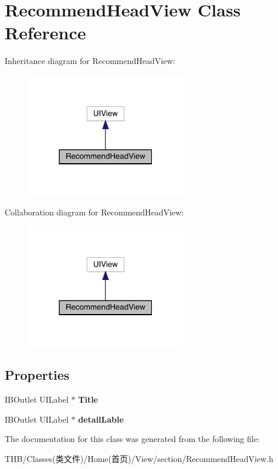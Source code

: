\hypertarget{interface_recommend_head_view}{}\section{Recommend\+Head\+View Class Reference}
\label{interface_recommend_head_view}


Inheritance diagram for Recommend\+Head\+View\+:\nopagebreak
\begin{figure}[H]
\begin{center}
\leavevmode
\includegraphics[width=198pt]{interface_recommend_head_view__inherit__graph}
\end{center}
\end{figure}


Collaboration diagram for Recommend\+Head\+View\+:\nopagebreak
\begin{figure}[H]
\begin{center}
\leavevmode
\includegraphics[width=198pt]{interface_recommend_head_view__coll__graph}
\end{center}
\end{figure}
\subsection*{Properties}
\begin{DoxyCompactItemize}
\item 
\mbox{\label{interface_recommend_head_view_abb386db5e358e88607799073239b62c7}} 
I\+B\+Outlet U\+I\+Label $\ast$ {\bfseries Title}
\item 
\mbox{\label{interface_recommend_head_view_ae84e96723949449f7c131d5fde4a7ba9}} 
I\+B\+Outlet U\+I\+Label $\ast$ {\bfseries detail\+Lable}
\end{DoxyCompactItemize}


The documentation for this class was generated from the following file\+:\begin{DoxyCompactItemize}
\item 
T\+H\+B/\+Classes(类文件)/\+Home(首页)/\+View/section/Recommend\+Head\+View.\+h\end{DoxyCompactItemize}
